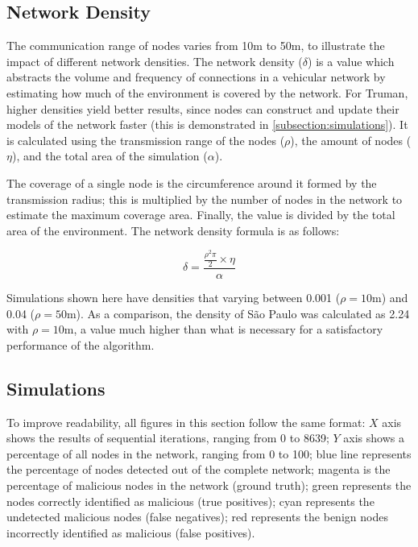 \documentclass[conference]{IEEEtran}
\begin{document}
\subsection{Network Density}


The communication range of nodes varies from 10m to 50m, to illustrate the impact of different network densities.
The network density ($\delta$) is a value which abstracts the volume and frequency of connections in a vehicular network by estimating how much of the environment is covered by the network.
For Truman, higher densities yield better results, since nodes can construct and update their models of the network faster (this is demonstrated in \autoref{subsection:simulations}).
It is calculated using the transmission range of the nodes ($\rho$), the amount of nodes ($\eta$), and the total area of the simulation ($\alpha$).

The coverage of a single node is the circumference around it formed by the transmission radius; this is multiplied by the number of nodes in the network to estimate the maximum coverage area.
Finally, the value is divided by the total area of the environment.
The network density formula is as follows:

$$ \delta = \frac{\frac{\rho^2\pi}{2} \times \eta}{\alpha} $$

Simulations shown here have densities that varying between 0.001 ($\rho = 10$m) and 0.04 ($\rho = 50$m).
As a comparison, the density of São Paulo was calculated as 2.24 with $\rho = 10$m, a value much higher than what is necessary for a satisfactory performance of the algorithm.

\subsection{Simulations}
\label{subsection:simulations}
To improve readability, all figures in this section follow the same format:
$X$ axis shows the results of sequential iterations, ranging from 0 to 8639;
$Y$ axis shows a percentage of all nodes in the network, ranging from 0 to 100;
blue line represents the percentage of nodes detected out of the complete network;
magenta is the percentage of malicious nodes in the network (ground truth);
green represents the nodes correctly identified as malicious (true positives);
cyan represents the undetected malicious nodes (false negatives); 
red represents the benign nodes incorrectly identified as malicious (false positives).
\end{document}
